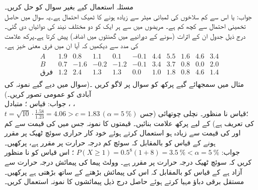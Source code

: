 \quad
مسئلہ  استعمال کیے بغیر سوال   کو حل کریں۔\\
جواب:\quad
{} یا اس سے کم  سلاخوں کی لمبائی  میٹر سے زیادہ ہونے کا ٹھیک  احتمال  ہے۔یہ سوال  میں حاصل تخمینی احتمال سے کچھ کم ہے۔
\quad
{} مریضوں میں سے ہر ایک کو دو مختلف نیند کی دوائیاں دی گئی۔درج ذیل جدول ان کے اثرات (سونے کے دورانیے میں گھنٹوں میں اضافہ) پیش کرتا ہے۔پرکھ علامت کی مدد سے دیکھیں کہ آیا ان میں فرق معنی خیز ہے۔\\
\begin{align*}
\begin{array}{c|rrrrrrrrrr}
A&1.9&0.8&1.1&0.1&-0.1&4.4&5.5&1.6&4.6&3.4\\
B&0.7&-1.6&-0.2&-1.2&-0.1&3.4&3.7&0.8&0.0&2.0\\
\hline
\text{فرق} &1.2&2.4&1.3&1.3&0.0&1.0&1.8&0.8&4.6&1.4
\end{array}
\end{align*}
\quad
مثال  میں سمجھائے گیے پرکھ کو  سوال  پر لاگو کریں ۔(سوال میں دیے گیے  نمونہ کی آبادی کو عمومی تصور کریں۔)  \\
جواب:\quad
قیاس ؛ متبادل ، ،\\
 $t=\sqrt{10}\cdot \tfrac{1.58}{1.23}=4.06>c=1.83\,(\alpha=\SI{5}{\percent})$
؛قیاس نا منظور۔
\quad
نچلی چوتھائی  (جس کی تعریف  ہے) کے لیے پرکھ علامت بنائیں۔ 
\quad
{} قیمتوں کا نمونہ جس میں  کی قیمت  سے کم اور  کی قیمت  سے زیادہ ہو استعمال کرتے ہوئے  خود کار حراری سوئچ ٹھیک  پر مقرر ہونے کے قیاس کو  بالمقابل کہ سوئچ کم درجہ حرارت پر مقرر ہے، پرکھیں۔\\
جواب:\quad
$P(X\ge1)=0.5^8(1+8)=\SI{3.5}{\percent}<\alpha=\SI{5}{\percent}$
؛ اس قیاس کو نا منظور کریں کہ سوئچ ٹھیک درجہ حرارت پر مقرر ہے۔
\quad
وولٹ پیما کی پیمائش درجہ حرارت  سے آزاد ہے کے قیاس کو بالمقابل کہ اس کی پیمائش بڑھتے  کے ساتھ بڑھتی ہے پرکھیں۔مستقل برقی دباؤ مہیا کرتے ہوئے حاصل درج ذیل پیمائشوں کا نمونہ استعمال کریں۔

